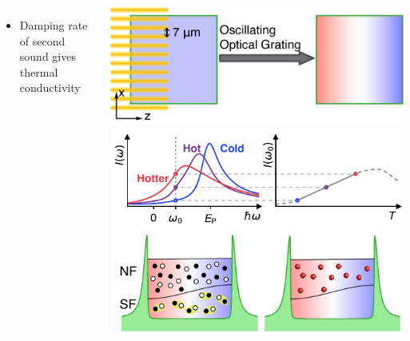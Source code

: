 \documentclass[26pt, paperwidth=36in,paperheight=48in]{tikzposter} %
\begin{document}
\begin{columns}
{\begin{minipage}{0.21\textwidth}
\begin{itemize}
				
				\item Damping rate of second sound gives thermal conductivity
			\end{itemize}
		\end{minipage}
		\hspace{1cm}
		\begin{minipage}{0.15\textwidth}
			\vspace{-0.21cm}
			\centering
			\hspace{0.5cm}
			\includegraphics[width=1.7\textwidth]{figures/SecondSoundExcitationRedone.png}
			\centering
			\includegraphics[width=1.7\textwidth,
			trim=0cm 3.2cm 0cm 0cm,clip]{figures/local_thermometer_redone.pdf}
		\end{minipage}
		
		
		
}
\end{columns}
\end{document}
